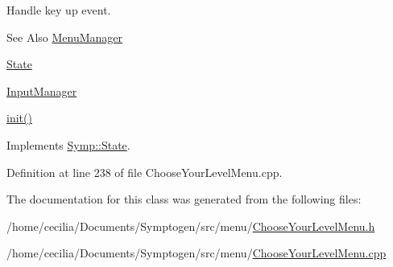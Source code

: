 Handle key up event. 

\begin{DoxySeeAlso}{See Also}
\hyperlink{class_symp_1_1_menu_manager}{Menu\-Manager} 

\hyperlink{class_symp_1_1_state}{State} 

\hyperlink{class_symp_1_1_input_manager}{Input\-Manager} 

\hyperlink{class_symp_1_1_choose_your_level_menu_a18c2d2aec31b070ecdd5ec8d2c8b4cbf}{init()} 
\end{DoxySeeAlso}


Implements \hyperlink{class_symp_1_1_state_a67d0fc2a02808bbcfdb06935c3be404f}{Symp\-::\-State}.



Definition at line 238 of file Choose\-Your\-Level\-Menu.\-cpp.



The documentation for this class was generated from the following files\-:\begin{DoxyCompactItemize}
\item 
/home/cecilia/\-Documents/\-Symptogen/src/menu/\hyperlink{_choose_your_level_menu_8h}{Choose\-Your\-Level\-Menu.\-h}\item 
/home/cecilia/\-Documents/\-Symptogen/src/menu/\hyperlink{_choose_your_level_menu_8cpp}{Choose\-Your\-Level\-Menu.\-cpp}\end{DoxyCompactItemize}
